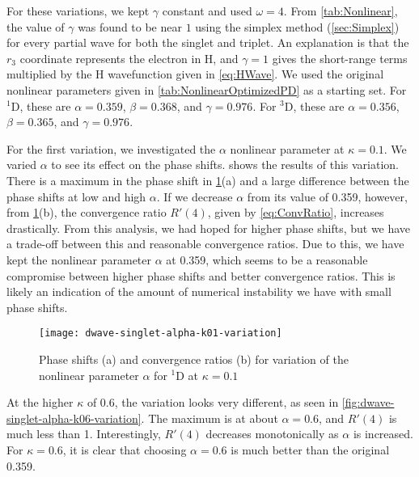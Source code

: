 \documentclass[Dissertation.tex]{subfiles}
\begin{document}
For these variations, we kept $\gamma$ constant and used $\omega = 4$. From 
\cref{tab:Nonlinear}, the value of $\gamma$ was found to be near $1$ using 
the simplex method (\cref{sec:Simplex}) for every partial wave for both the 
singlet and triplet. An explanation is that the $r_3$ coordinate represents 
the electron in H, and $\gamma = 1$ gives the short-range terms multiplied by 
the H wavefunction given in \cref{eq:HWave}. We used the original nonlinear 
parameters given in \cref{tab:NonlinearOptimizedPD} as a starting set. For
$^1$D, these are $\alpha = 0.359$, $\beta = 0.368$, and $\gamma = 0.976$. For
$^3$D, these are $\alpha = 0.356$, $\beta = 0.365$, and $\gamma = 0.976$.

For the first variation, we investigated the $\alpha$ nonlinear parameter at
$\kappa = 0.1$. We varied $\alpha$ to see its effect on the phase shifts.
 shows the results of this
variation. There is a maximum in the phase shift in 
\cref{fig:dwave-singlet-alpha-k01-variation}(a) and a large difference between
the phase shifts at low and high $\alpha$. If we decrease
$\alpha$ from its value of 0.359, however, from
\cref{fig:dwave-singlet-alpha-k01-variation}(b),
the convergence ratio $R'(4)$, given by \cref{eq:ConvRatio},
increases drastically. From this analysis, we had hoped for higher phase shifts,
but we have a trade-off between this and reasonable convergence ratios. Due to
this, we have kept the nonlinear parameter $\alpha$ at 0.359, which seems to be
a reasonable compromise between higher phase shifts and better convergence
ratios. This is likely an indication of the amount of numerical instability
we have with small phase shifts.


\begin{figure}
	\centering
	\texttt{[image: dwave-singlet-alpha-k01-variation]}
	\caption[Variation of the nonlinear parameter $\alpha$ for $^{1}$D at $\kappa = 0.1$]{Phase shifts (a) and convergence ratios (b) for variation of the nonlinear parameter $\alpha$ for $^{1}$D at $\kappa = 0.1$}
	\label{fig:dwave-singlet-alpha-k01-variation}
\end{figure}

At the higher $\kappa$ of 0.6, the variation looks very different, as seen in
\cref{fig:dwave-singlet-alpha-k06-variation}. The maximum is at about
$\alpha = 0.6$, and $R'(4)$ is much less than 1. Interestingly,
$R'(4)$ decreases monotonically as $\alpha$ is increased. For
$\kappa = 0.6$, it is clear that choosing $\alpha = 0.6$ is much better than
the original 0.359.
\end{document}
